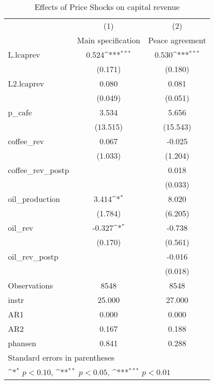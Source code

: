\begin{table}[htbp]\centering
\def\sym#1{\ifmmode^{#1}\else\(^{#1}\)\fi}
\caption{Effects of Price Shocks on capital revenue}
\begin{tabular}{l*{2}{c}}
\hline\hline
                &\multicolumn{1}{c}{(1)}&\multicolumn{1}{c}{(2)}\\
                &\multicolumn{1}{c}{Main specification}&\multicolumn{1}{c}{Peace agreement}\\
\hline
L.lcaprev       &    0.524\sym{***}&    0.530\sym{***}\\
                &  (0.171)         &  (0.180)         \\
[1em]
L2.lcaprev      &    0.080         &    0.081         \\
                &  (0.049)         &  (0.051)         \\
[1em]
p\_cafe          &    3.534         &    5.656         \\
                & (13.515)         & (15.543)         \\
[1em]
coffee\_rev      &    0.067         &   -0.025         \\
                &  (1.033)         &  (1.204)         \\
[1em]
coffee\_rev\_postp&                  &    0.018         \\
                &                  &  (0.033)         \\
[1em]
oil\_production  &    3.414\sym{*}  &    8.020         \\
                &  (1.784)         &  (6.205)         \\
[1em]
oil\_rev         &   -0.327\sym{*}  &   -0.738         \\
                &  (0.170)         &  (0.561)         \\
[1em]
oil\_rev\_postp   &                  &   -0.016         \\
                &                  &  (0.018)         \\
\hline
Observations    &     8548         &     8548         \\
instr           &   25.000         &   27.000         \\
AR1             &    0.000         &    0.000         \\
AR2             &    0.167         &    0.188         \\
phansen         &    0.841         &    0.288         \\
\hline\hline
\multicolumn{3}{l}{\footnotesize Standard errors in parentheses}\\
\multicolumn{3}{l}{\footnotesize \sym{*} \(p<0.10\), \sym{**} \(p<0.05\), \sym{***} \(p<0.01\)}\\
\end{tabular}
\end{table}
